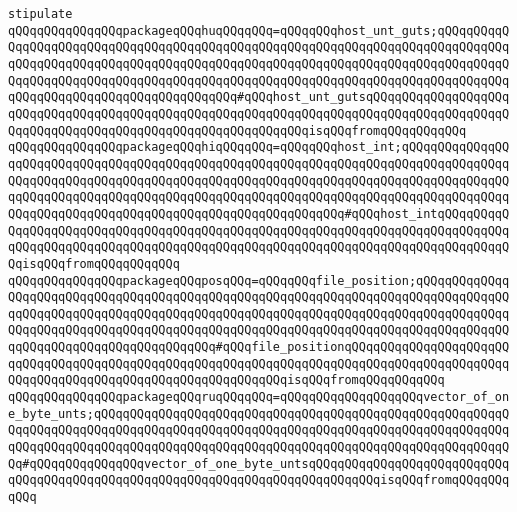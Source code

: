 \newline
\newline
\verb|stipulate|\newline
\verb|qQQqqQQqqQQqqQQqpackageqQQqhuqQQqqQQq=qQQqqQQqhost_unt_guts;qQQqqQQqqQQqqQQqqQQqqQQqqQQqqQQqqQQqqQQqqQQqqQQqqQQqqQQqqQQqqQQqqQQqqQQqqQQqqQQqqQQqqQQqqQQqqQQqqQQqqQQqqQQqqQQqqQQqqQQqqQQqqQQqqQQqqQQqqQQqqQQqqQQqqQQqqQQqqQQqqQQqqQQqqQQqqQQqqQQqqQQqqQQqqQQqqQQqqQQqqQQqqQQqqQQqqQQqqQQqqQQqqQQqqQQqqQQqqQQqqQQqqQQqqQQq#qQQqhost_unt_gutsqQQqqQQqqQQqqQQqqQQqqQQqqQQqqQQqqQQqqQQqqQQqqQQqqQQqqQQqqQQqqQQqqQQqqQQqqQQqqQQqqQQqqQQqqQQqqQQqqQQqqQQqqQQqqQQqqQQqqQQqqQQqqQQqqQQqisqQQqfromqQQqqQQqqQQq|\newline
\verb|qQQqqQQqqQQqqQQqpackageqQQqhiqQQqqQQq=qQQqqQQqhost_int;qQQqqQQqqQQqqQQqqQQqqQQqqQQqqQQqqQQqqQQqqQQqqQQqqQQqqQQqqQQqqQQqqQQqqQQqqQQqqQQqqQQqqQQqqQQqqQQqqQQqqQQqqQQqqQQqqQQqqQQqqQQqqQQqqQQqqQQqqQQqqQQqqQQqqQQqqQQqqQQqqQQqqQQqqQQqqQQqqQQqqQQqqQQqqQQqqQQqqQQqqQQqqQQqqQQqqQQqqQQqqQQqqQQqqQQqqQQqqQQqqQQqqQQqqQQqqQQqqQQqqQQqqQQqqQQq#qQQqhost_intqQQqqQQqqQQqqQQqqQQqqQQqqQQqqQQqqQQqqQQqqQQqqQQqqQQqqQQqqQQqqQQqqQQqqQQqqQQqqQQqqQQqqQQqqQQqqQQqqQQqqQQqqQQqqQQqqQQqqQQqqQQqqQQqqQQqqQQqqQQqqQQqqQQqqQQqisqQQqfromqQQqqQQqqQQq|\newline
\verb|qQQqqQQqqQQqqQQqpackageqQQqposqQQq=qQQqqQQqfile_position;qQQqqQQqqQQqqQQqqQQqqQQqqQQqqQQqqQQqqQQqqQQqqQQqqQQqqQQqqQQqqQQqqQQqqQQqqQQqqQQqqQQqqQQqqQQqqQQqqQQqqQQqqQQqqQQqqQQqqQQqqQQqqQQqqQQqqQQqqQQqqQQqqQQqqQQqqQQqqQQqqQQqqQQqqQQqqQQqqQQqqQQqqQQqqQQqqQQqqQQqqQQqqQQqqQQqqQQqqQQqqQQqqQQqqQQqqQQqqQQqqQQqqQQqqQQq#qQQqfile_positionqQQqqQQqqQQqqQQqqQQqqQQqqQQqqQQqqQQqqQQqqQQqqQQqqQQqqQQqqQQqqQQqqQQqqQQqqQQqqQQqqQQqqQQqqQQqqQQqqQQqqQQqqQQqqQQqqQQqqQQqqQQqqQQqqQQqisqQQqfromqQQqqQQqqQQq|\newline
\verb|qQQqqQQqqQQqqQQqpackageqQQqruqQQqqQQq=qQQqqQQqqQQqqQQqqQQqvector_of_one_byte_unts;qQQqqQQqqQQqqQQqqQQqqQQqqQQqqQQqqQQqqQQqqQQqqQQqqQQqqQQqqQQqqQQqqQQqqQQqqQQqqQQqqQQqqQQqqQQqqQQqqQQqqQQqqQQqqQQqqQQqqQQqqQQqqQQqqQQqqQQqqQQqqQQqqQQqqQQqqQQqqQQqqQQqqQQqqQQqqQQqqQQqqQQqqQQqqQQqqQQqqQQq#qQQqqQQqqQQqqQQqvector_of_one_byte_untsqQQqqQQqqQQqqQQqqQQqqQQqqQQqqQQqqQQqqQQqqQQqqQQqqQQqqQQqqQQqqQQqqQQqqQQqqQQqqQQqisqQQqfromqQQqqQQqqQQq|\newline
